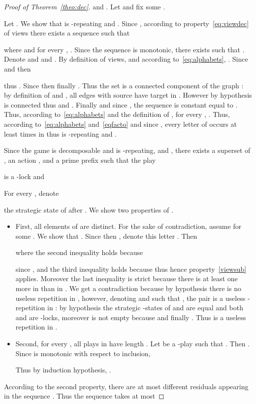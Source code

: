 \documentclass[a4paper,UKenglish]{lipics-v2016}
\newcommand{\TT}{\mathbb{T}}
\begin{document}
\begin{proof}[Proof of Theorem~\ref{theo:dec}]
and 
.
Let  and fix some .

Let 
.
We show that  is -repeating
and .
Since
,
according to property~\eqref{eq:viewdec}
of views
there exists a sequence 
 such that

where  and for every ,
.
Since the sequence
 is monotonic,
there exists 
such that .
Denote 
and 
and
.
By definition of views,
and according to~\eqref{eq:alphabets},
. Since  and  then

thus . Since  then finally .
Thus the set  is a connected component of the graph :
by definition of  and , all edges with source  have target in .
However by hypothesis  is connected thus 
and .
Finally  and since ,
the sequence  is constant equal to .
Thus, according to~\eqref{eq:alphabets} and the definition of ,
for every ,
.
Thus, according to~\eqref{eq:alphabets} and~\eqref{eqfacto}
and since ,
every letter of  occurs at least  times in 
thus
 is -repeating and .

Since the game is 
decomposable
and  is -repeating,
and
,
there exists
a superset  of ,
an action ,
and a prime prefix 
such that
the play

is a -lock
and
\newcommand{\Tl}{\TT^{(\ell)}}


For every ,
denote

the  strategic state of  after .
We show two properties of .
\begin{itemize}
\item
First, all elements of  are distinct.
For the sake of contradiction, assume 
for some .
We show that .
Since  then  , denote this letter .
Then

where the second inequality holds
because

since ,
and the third inequality holds because 
thus  hence property~\eqref{viewsub} applies.
Moreover the last inequality is strict because there is at least one more  in
 than in .
We get a contradiction because by hypothesis there is no useless repetition in ,
however, denoting  and  such that ,
the pair  is a useless -repetition in :
by hypothesis the strategic -states of  and  are equal and both  and  are -locks, moreover  is not empty because 
and finally .
Thus  is a useless repetition in .
\item
Second, for every , 
all plays in  have length .
Let  be a -play such that .
Then .
Since  is monotonic with respect to inclusion,

Thus by induction hypothesis,
.
\end{itemize}

According to the second property,
there
are at most  different residuals appearing in the sequence
.
Thus the sequence  takes at most 


\end{proof}
\end{document}
